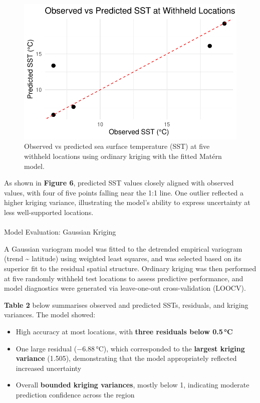 \documentclass[
  11pt,
]{article}
\makeatletter
\let\oldparagraph\paragraph
\renewcommand{\paragraph}{
    \@ifstar
      \xxxParagraphStar
      \xxxParagraphNoStar
  }
\newcommand{\xxxParagraphStar}[1]{\oldparagraph*{#1}\mbox{}}
\newcommand{\xxxParagraphNoStar}[1]{\oldparagraph{#1}\mbox{}}
\makeatother
\begin{document}
\begin{figure}[H]

{\centering \includegraphics{project_files/figure-pdf/fig-krigscatter-1.pdf}

}

\caption{Observed vs predicted sea surface temperature (SST) at five
withheld locations using ordinary kriging with the fitted Matérn model.}

\end{figure}%

As shown in \textbf{Figure 6}, predicted SST values closely aligned with
observed values, with four of five points falling near the 1:1 line. One
outlier reflected a higher kriging variance, illustrating the model's
ability to express uncertainty at less well-supported locations.

\paragraph{Model Evaluation: Gaussian
Kriging}\label{model-evaluation-gaussian-kriging}

A Gaussian variogram model was fitted to the detrended empirical
variogram (trend \textasciitilde{} latitude) using weighted least
squares, and was selected based on its superior fit to the residual
spatial structure. Ordinary kriging was then performed at five randomly
withheld test locations to assess predictive performance, and model
diagnostics were generated via leave-one-out cross-validation (LOOCV).

\textbf{Table 2} below summarises observed and predicted SSTs,
residuals, and kriging variances. The model showed:

\begin{itemize}
\item
  High accuracy at most locations, with \textbf{three residuals below
  0.5\,°C}
\item
  One large residual (−6.88\,°C), which corresponded to the
  \textbf{largest kriging variance} (1.505), demonstrating that the
  model appropriately reflected increased uncertainty
\item
  Overall \textbf{bounded kriging variances}, mostly below 1, indicating
  moderate prediction confidence across the region
\end{itemize}
\end{document}
